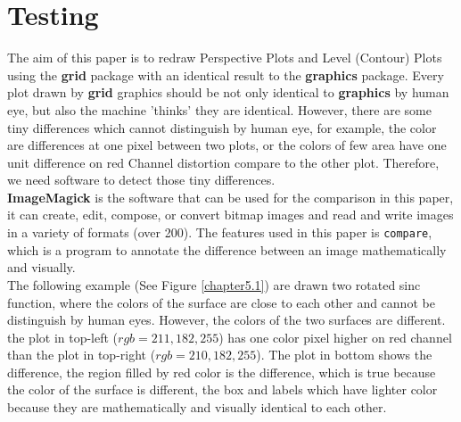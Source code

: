 \documentclass[11pt,twoside]{report}
\begin{document}
\chapter{Testing}
The aim of this paper is to redraw Perspective Plots and Level (Contour) Plots using the \textbf{grid} package with an identical result to the \textbf{graphics} package. Every plot drawn by \textbf{grid} graphics should be not only identical to \textbf{graphics} by human eye, but also the machine 'thinks' they are identical. However, there are some tiny differences which cannot distinguish by human eye, for example, the color are differences at one pixel between two plots, or the colors of few area have one unit difference on red Channel distortion compare to the other plot. Therefore, we need software to detect those tiny differences.\\

\textbf{ImageMagick} \citep{ImageMagick} is the software that can be used for the comparison in this paper, it can create, edit, compose, or convert bitmap images and read and write images in a variety of formats (over 200). The features used in this paper is \texttt{compare}, which is a program to annotate the difference between an image mathematically and visually.\\

The following example (See Figure \ref{chapter5.1}) are drawn two rotated sinc function, where the colors of the surface are close to each other and cannot be distinguish by human eyes. However, the colors of the two surfaces are different. the plot in top-left ($rgb = 211, 182, 255$) has one color pixel higher on red channel than the plot in top-right ($rgb = 210, 182, 255$). The plot in bottom shows the difference, the region filled by red color is the difference, which is true because the color of the surface is different, the box and labels which have lighter color because they are mathematically and visually identical to each other. \\
\end{document}
